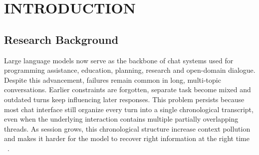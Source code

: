 \chapter{INTRODUCTION}\label{sec1}
\vspace{-3em}

\section{Research Background}






Large language models now serve as the backbone of chat systems used for programming assistance, education, planning, research and open-domain dialogue. Despite this advancement, failures remain common in long, multi-topic conversations. Earlier constraints are forgotten, separate task become mixed and outdated turns keep influencing later responses. This problem persists because most chat interface still organize every turn into a single chronological transcript, even when the underlying interaction contains multiple partially overlapping threads. As session grows, this chronological structure increase context pollution and makes it harder for the model to recover right information at the right time ~\cite{liu2023lostinthemiddle,laban2024limt}.










